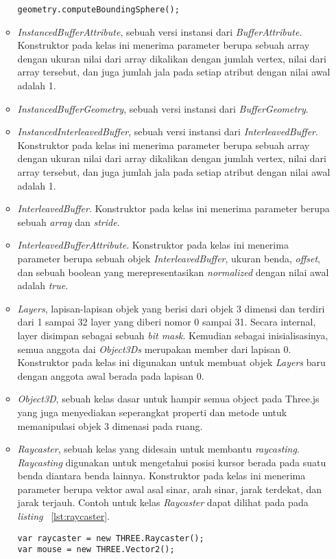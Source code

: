 \begin{itemize}
\begin{itemize}
\begin{lstlisting}[caption={Contoh instansiasi kelas {\it Geometry}.}, label={lst:Geo},captionpos=b]
geometry.computeBoundingSphere();
\end{lstlisting}
		\item{\it InstancedBufferAttribute}, sebuah versi instansi dari {\it BufferAttribute}. Konstruktor pada kelas ini menerima parameter berupa sebuah array dengan ukuran nilai dari array dikalikan dengan jumlah vertex, nilai dari array tersebut, dan juga jumlah jala pada setiap atribut dengan nilai awal adalah 1.
		\item{\it InstancedBufferGeometry}, sebuah versi instansi dari {\it BufferGeometry}.
		\item{\it InstancedInterleavedBuffer}, sebuah versi instansi dari {\it InterleavedBuffer}. Konstruktor pada kelas ini menerima parameter berupa sebuah array dengan ukuran nilai dari array dikalikan dengan jumlah vertex, nilai dari array tersebut, dan juga jumlah jala pada setiap atribut dengan nilai awal adalah 1.
		\item{\it InterleavedBuffer}. Konstruktor pada kelas ini menerima parameter berupa sebuah {\it array} dan {\it stride}.
		\item{\it InterleavedBufferAttribute}. Konstruktor pada kelas ini menerima parameter berupa sebuah objek {\it InterleavedBuffer}, ukuran benda, {\it offset}, dan sebuah boolean yang merepresentasikan {\it normalized} dengan nilai awal adalah {\it true}.
		\item{\it Layers}, lapisan-lapisan objek yang berisi dari objek 3 dimensi dan terdiri dari 1 sampai 32 layer yang diberi nomor 0 sampai 31. Secara internal, layer disimpan sebagai sebuah {\it bit mask}. Kemudian sebagai inisialisasinya, semua anggota dai {\it Object3Ds} merupakan member dari lapisan 0. Konstruktor pada kelas ini digunakan untuk membuat objek {\it Layers} baru dengan anggota awal berada pada lapisan 0.
		\item{\it Object3D}, sebuah kelas dasar untuk hampir semua object pada Three.js yang juga menyediakan seperangkat properti dan metode untuk memanipulasi objek 3 dimenasi pada ruang.
		\item{\it Raycaster}, sebuah kelas yang didesain untuk membantu {\it raycasting}. {\it Raycasting} digunakan untuk mengetahui posisi kursor berada pada suatu benda diantara benda lainnya. Konstruktor pada kelas ini menerima parameter berupa vektor awal asal sinar, arah sinar, jarak terdekat, dan jarak terjauh. Contoh untuk kelas {\it Raycaster} dapat dilihat pada pada {\it listing} ~\ref{lst:raycaster}.
\begin{lstlisting}[caption={Contoh penggunaan kelas {\it Raycaster}.}, label={lst:raycaster},captionpos=b]
var raycaster = new THREE.Raycaster();
var mouse = new THREE.Vector2();


\end{lstlisting}
\end{itemize}
\end{itemize}
